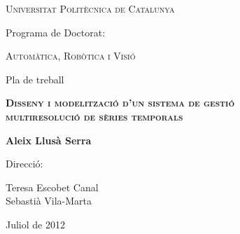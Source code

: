 \begin{titlepage}
  \begin{center} 

   

    {\Large \scshape Universitat Politècnica de Catalunya} \vskip 1cm 

    {Programa de Doctorat:} \vskip 0.5cm 
    
    {\scshape Automàtica, Robòtica i Visió} \vfill%

    {Pla de treball} \vskip 1cm 
    
    {\scshape \bfseries \Large Disseny i modelització d'un sistema de gestió\\
       multiresolució de sèries temporals} \vskip 2cm

    {\bfseries Aleix Llusà Serra} \vfill%

    {Direcció:}
       
    {Teresa Escobet Canal \\
    Sebastià Vila-Marta}  \vskip 1cm 


    {Juliol de 2012}

\end{center}
\end{titlepage}





  






